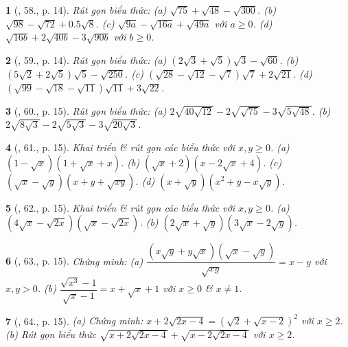 \documentclass{article}
\newtheorem{baitoan}{}%
\begin{document}
\begin{baitoan}[\cite{SBT_Toan_9_tap_1}, 58., p. 14]
	Rút gọn biểu thức: (a) $\sqrt{75} + \sqrt{48} - \sqrt{300}$. (b) $\sqrt{98} - \sqrt{72} + 0.5\sqrt{8}$. (c) $\sqrt{9a} - \sqrt{16a} + \sqrt{49a}$ với $a\ge0$. (d) $\sqrt{16b} + 2\sqrt{40b} - 3\sqrt{90b}$ với $b\ge0$.
\end{baitoan}

\begin{baitoan}[\cite{SBT_Toan_9_tap_1}, 59., p. 14]
	Rút gọn biểu thức: (a) $(2\sqrt{3} + \sqrt{5})\sqrt{3} - \sqrt{60}$. (b) $(5\sqrt{2} + 2\sqrt{5})\sqrt{5} - \sqrt{250}$. (c) $(\sqrt{28} - \sqrt{12} - \sqrt{7})\sqrt{7} + 2\sqrt{21}$. (d) $(\sqrt{99} - \sqrt{18} - \sqrt{11})\sqrt{11} + 3\sqrt{22}$.
\end{baitoan}

\begin{baitoan}[\cite{SBT_Toan_9_tap_1}, 60., p. 15]
	Rút gọn biểu thức: (a) $2\sqrt{40\sqrt{12}} - 2\sqrt{\sqrt{75}} - 3\sqrt{5\sqrt{48}}$. (b) $2\sqrt{8\sqrt{3}} - 2\sqrt{5\sqrt{3}} - 3\sqrt{20\sqrt{3}}$. 
\end{baitoan}

\begin{baitoan}[\cite{SBT_Toan_9_tap_1}, 61., p. 15]
	Khai triển \& rút gọn các biểu thức với $x,y\ge0$. (a) $(1 - \sqrt{x})(1 + \sqrt{x} + x)$. (b) $(\sqrt{x} + 2)(x - 2\sqrt{x} + 4)$. (c) $(\sqrt{x} - \sqrt{y})(x + y + \sqrt{xy})$. (d) $(x + \sqrt{y})(x^2 + y - x\sqrt{y})$.
\end{baitoan}

\begin{baitoan}[\cite{SBT_Toan_9_tap_1}, 62., p. 15]
	Khai triển \& rút gọn các biểu thức với $x,y\ge0$. (a) $(4\sqrt{x} - \sqrt{2x})(\sqrt{x} - \sqrt{2x})$. (b) $(2\sqrt{x} + \sqrt{y})(3\sqrt{x} - 2\sqrt{y})$.
\end{baitoan}

\begin{baitoan}[\cite{SBT_Toan_9_tap_1}, 63., p. 15]
	Chứng minh: (a) $\dfrac{(x\sqrt{y} + y\sqrt{x})(\sqrt{x} - \sqrt{y})}{\sqrt{xy}} = x - y$ với $x,y > 0$. (b) $\dfrac{\sqrt{x^3} - 1}{\sqrt{x} - 1} = x + \sqrt{x} + 1$ với $x\ge0$ \& $x\ne1$.
\end{baitoan}

\begin{baitoan}[\cite{SBT_Toan_9_tap_1}, 64., p. 15]
	(a) Chứng minh: $x + 2\sqrt{2x - 4} = (\sqrt{2} + \sqrt{x - 2})^2$ với $x\ge2$. (b) Rút gọn biểu thức $\sqrt{x + 2\sqrt{2x - 4}} + \sqrt{x - 2\sqrt{2x - 4}}$ với $x\ge2$.
\end{baitoan}
\end{document}
